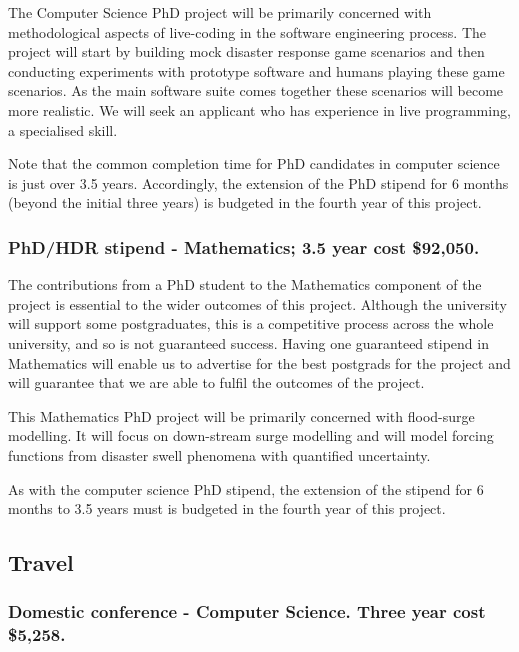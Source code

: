 \documentclass[a4paper,twoside,12pt,compact]{article}
\begin{document}
The Computer Science PhD project will be primarily concerned with methodological aspects of live-coding in the software engineering process. The project will start by building mock disaster response game scenarios and then conducting experiments with prototype software and humans playing these game scenarios. As the main software suite comes together these scenarios will become more realistic. We will seek an applicant who has experience in live programming, a specialised skill. 

Note that the common completion time for PhD candidates in computer science is just over 3.5 years. Accordingly,  the extension of the PhD stipend for 6 months (beyond the initial three years) is budgeted in the fourth year of this project.  

\subsubsection*{PhD/HDR stipend - Mathematics; 3.5 year cost \$92,050.}

The contributions from a PhD student to the Mathematics component of the project is essential to the wider outcomes of this project.
Although the university will support some postgraduates, this is a competitive
process across the whole university, and so is not guaranteed success. Having one guaranteed stipend in Mathematics will enable us to advertise for the best postgrads for the project and will guarantee that we are able to fulfil the outcomes of the project. 

This Mathematics PhD project will be primarily concerned with flood-surge modelling. It will focus on down-stream surge modelling and will model forcing functions from disaster swell phenomena with quantified uncertainty. 

As with the computer science PhD stipend, the extension of the stipend for 6 months to 3.5 years must is budgeted in the fourth year of this project.

\subsection*{Travel}

\subsubsection*{Domestic conference - Computer Science. Three year cost \$5,258.}
\end{document}
